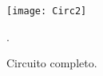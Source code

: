 \begin{figure}[H]
	\centering
	\texttt{[image: Circ2]}
	\caption{Circuito completo.}.
	\label{fig:Circ2}
\end{figure}